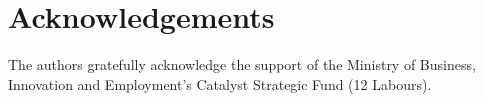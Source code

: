 \documentclass[fleqn,10pt]{physiome}
\begin{document}
\section{Acknowledgements}
The authors gratefully acknowledge the support of the Ministry of Business, Innovation and Employment’s
Catalyst Strategic Fund (12 Labours).

\FloatBarrier




\end{document}
